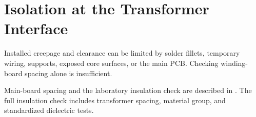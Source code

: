\section{Isolation at the Transformer Interface}
\label{sec:mag-isolation}

Installed creepage and clearance can be limited by solder fillets, temporary wiring, supports, exposed core surfaces, or the main PCB. Checking winding-board spacing alone is insufficient.

Main-board spacing and the laboratory insulation check are described in . The full insulation check includes transformer spacing, material group, and standardized dielectric tests.
